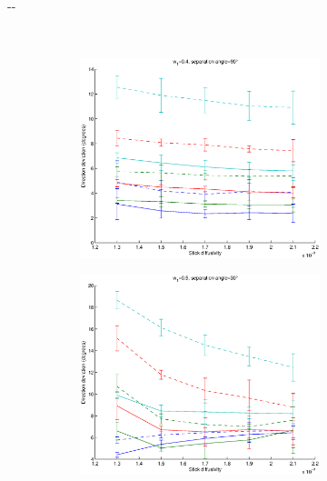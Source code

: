 \documentclass{article}
\begin{document}
\begin{figure}[H]
\begin{adjustwidth}{-\oddsidemargin}{-\rightmargin}
\begin{subfigure}{0.8\paperwidth}
      ~
      \begin{subfigure}{0.3\textwidth}
        \centering
        \includegraphics[width=\textwidth]{figures/synth_modbas_weights_diffus__snr=20__w1=4__angle=90.eps}
      \end{subfigure}
  \end{subfigure}
  \begin{subfigure}{0.8\paperwidth}
      \begin{subfigure}{0.3\textwidth}
        \centering
        \includegraphics[width=\textwidth]{figures/synth_modbas_weights_diffus__snr=20__w1=5__angle=30.eps}

\end{subfigure}
\end{subfigure}
\end{adjustwidth}
\end{figure}
\end{document}

